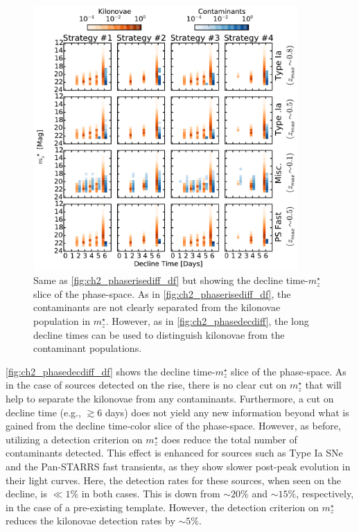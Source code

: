 \begin{figure}[t!]
\centering
\includegraphics[width=0.9\textwidth]{./figs/chapter2/ch2_f17.pdf}
\caption{Same as \autoref{fig:ch2_phaserisediff_df} but showing the decline time-$m^{\star}_z$ slice of the phase-space. As in \autoref{fig:ch2_phaserisediff_df}, the contaminants are not clearly separated from the kilonovae population in $m^{\star}_z$. However, as in \autoref{fig:ch2_phasedecdiff}, the long decline times can be used to distinguish kilonovae from the contaminant populations.}
\label{fig:ch2_phasedecdiff_df}
\end{figure}

\autoref{fig:ch2_phasedecdiff_df} shows the decline time-$m^{\star}_z$ slice of the phase-space. As in the case of sources detected on the rise, there is no clear cut on $m^{\star}_z$ that will help to separate the kilonovae from any contaminants. Furthermore, a cut on decline time (e.g., $\gtrsim 6$ days) does not yield any new information beyond what is gained from the decline time-color slice of the phase-space. However, as before, utilizing a detection criterion on $m^{\star}_z$ does reduce the total number of contaminants detected. This effect is enhanced for sources such as Type Ia SNe and the Pan-STARRS fast transients, as they show slower post-peak evolution in their light curves. Here, the detection rates for these sources, when seen on the decline, is $\ll1\%$ in both cases. This is down from $\sim20\%$ and $\sim15\%$, respectively, in the case of a pre-existing template. However, the detection criterion on $m^{\star}_z$ reduces the kilonovae detection rates by $\sim5\%$.

